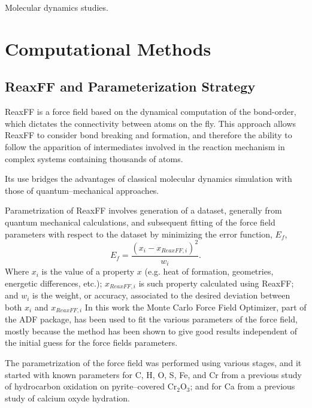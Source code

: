 \documentclass[journal=jpcafh,manuscript=article]{achemso}
\begin{document}
Molecular dynamics studies.\cite{wang_coarse-grained_2014}

\section{Computational Methods}

\subsection{ReaxFF and Parameterization Strategy}

ReaxFF is a force field based on the dynamical computation of the bond-order, which dictates the connectivity between atoms on the fly.
This approach allows ReaxFF to consider bond breaking and formation, and therefore the ability to follow the apparition of intermediates involved in the reaction mechanism in complex systems containing thousands of atoms.\cite{migliorati_development_2017,merinov_reaxff_2014,
raymand_reactive_2008,
shin_development_2015,
van_duin_reaxff_2008,
goddard_development_2006,
hubin_parameterization_2016,
senftle_reaxff_2016,
chenoweth_reaxff_2009,
chenoweth_reaxff_2008,
van_duin_reaxff_2008-1,
liu_reaxff-lg:_2011}

Its use bridges the advantages of classical molecular dynamics simulation with those of quantum--mechanical approaches.

Parametrization of ReaxFF involves generation of a dataset, generally from quantum mechanical calculations, and subsequent fitting of the force field parameters with respect to the dataset by minimizing the error function, $E_f$,
\begin{equation}
E_f = \frac{(x_{i} - x_{ReaxFF,i})^2}{w_i}.
\end{equation}
Where $x_{i}$ is the value of a property $x$ (e.g. heat of formation, geometries, energetic differences, etc.); $x_{ReaxFF,i}$ is such property calculated using ReaxFF; and $w_i$ is the weight, or accuracy, associated to the desired deviation between both $x_i$ and $x_{ReaxFF,i}$
In this work the Monte Carlo Force Field Optimizer,\cite{iype_parameterization_2013} part of the ADF package, has been used to fit the various parameters of the force field, mostly because the method has been shown to give good results independent of the initial guess for the force fields parameters.

The parametrization of the force field was performed using various stages, and it started with known parameters for C, H, O, S, Fe, and Cr from a previous study of hydrocarbon oxidation on pyrite--covered Cr$_2$O$_3$; \cite{shin_development_2015} and for Ca from a previous study of calcium oxyde hydration. \cite{manzano_hydration_2012}
\end{document}
